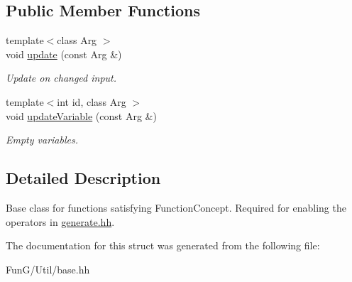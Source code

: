\subsection*{Public Member Functions}
\begin{DoxyCompactItemize}
\item 
\hypertarget{structFunG_1_1Base_af999fe33451a4d02b7296758b1face5d}{{\footnotesize template$<$class Arg $>$ }\\void \hyperlink{structFunG_1_1Base_af999fe33451a4d02b7296758b1face5d}{update} (const Arg \&)}\label{structFunG_1_1Base_af999fe33451a4d02b7296758b1face5d}

\begin{DoxyCompactList}\small\item\em Update on changed input. \end{DoxyCompactList}\item 
\hypertarget{structFunG_1_1Base_aa87528c3cc5711d8645bd8f86333a07b}{{\footnotesize template$<$int id, class Arg $>$ }\\void \hyperlink{structFunG_1_1Base_aa87528c3cc5711d8645bd8f86333a07b}{update\-Variable} (const Arg \&)}\label{structFunG_1_1Base_aa87528c3cc5711d8645bd8f86333a07b}

\begin{DoxyCompactList}\small\item\em Empty variables. \end{DoxyCompactList}\end{DoxyCompactItemize}


\subsection{Detailed Description}
Base class for functions satisfying Function\-Concept. Required for enabling the operators in \hyperlink{generate_8hh_source}{generate.\-hh}. 

The documentation for this struct was generated from the following file\-:\begin{DoxyCompactItemize}
\item 
Fun\-G/\-Util/base.\-hh\end{DoxyCompactItemize}
